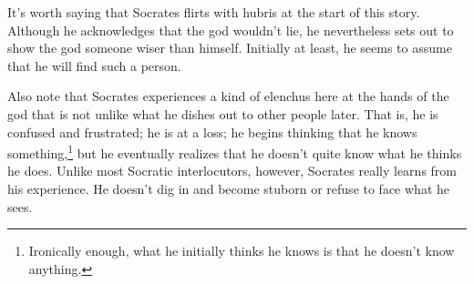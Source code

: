 \documentclass[11pt]{article}
\begin{document}
It's worth saying that Socrates flirts with hubris at the start of this
story.  Although he acknowledges that the god wouldn't lie, he nevertheless
sets out to show the god someone wiser than himself.  Initially at least,
he seems to assume that he will find such a person.

Also note that Socrates experiences a kind of elenchus here at the hands of
the god that is not unlike what he dishes out to other people later. That
is, he is confused and frustrated; he is at a loss; he begins thinking that
he knows something,\footnote{Ironically enough, what he initially thinks he
knows is that he doesn't know anything.} but he eventually realizes that
he doesn't quite know what he thinks he does.  Unlike most Socratic
interlocutors, however, Socrates really learns from his experience.  He
doesn't dig in and become stuborn or refuse to face what he sees.






\newpage


\end{document}
